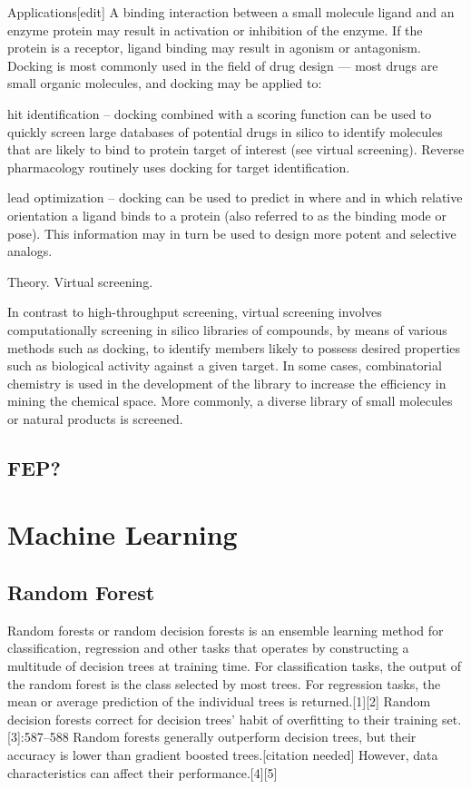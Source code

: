 Applications[edit]
A binding interaction between a small molecule ligand and an enzyme protein may result in activation or inhibition of the enzyme. If the protein is a receptor, ligand binding may result in agonism or antagonism. Docking is most commonly used in the field of drug design — most drugs are small organic molecules, and docking may be applied to:

hit identification – docking combined with a scoring function can be used to quickly screen large databases of potential drugs in silico to identify molecules that are likely to bind to protein target of interest (see virtual screening). Reverse pharmacology routinely uses docking for target identification.

lead optimization – docking can be used to predict in where and in which relative orientation a ligand binds to a protein (also referred to as the binding mode or pose). This information may in turn be used to design more potent and selective analogs.

Theory. Virtual screening.

In contrast to high-throughput screening, virtual screening involves computationally screening in silico libraries of compounds, by means of various methods such as docking, to identify members likely to possess desired properties such as biological activity against a given target. In some cases, combinatorial chemistry is used in the development of the library to increase the efficiency in mining the chemical space. More commonly, a diverse library of small molecules or natural products is screened.

\subsection{FEP?}

\section{Machine Learning}

\subsection{Random Forest}

Random forests or random decision forests is an ensemble learning method for classification, regression and other tasks that operates by constructing a multitude of decision trees at training time. For classification tasks, the output of the random forest is the class selected by most trees. For regression tasks, the mean or average prediction of the individual trees is returned.[1][2] Random decision forests correct for decision trees' habit of overfitting to their training set.[3]:587–588 Random forests generally outperform decision trees, but their accuracy is lower than gradient boosted trees.[citation needed] However, data characteristics can affect their performance.[4][5]

